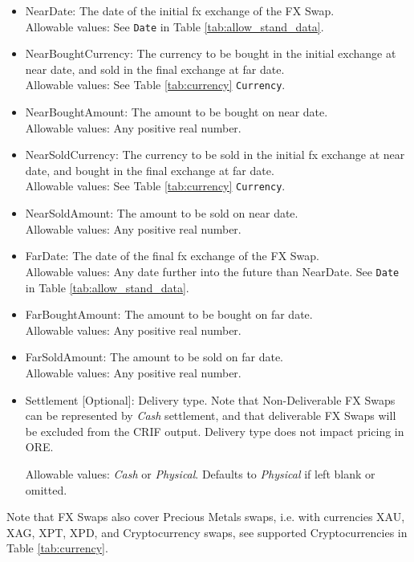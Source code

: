 \begin{itemize}
\item NearDate: The date of the initial fx exchange of the FX Swap. \\ Allowable values:  See \lstinline!Date! in Table \ref{tab:allow_stand_data}.
\item NearBoughtCurrency: The currency to be bought in the initial exchange at near date, and sold in the final exchange at far date.  \\ Allowable values:  See Table \ref{tab:currency} \lstinline!Currency!.
\item NearBoughtAmount: The amount to be bought on near date.  \\ Allowable values:  Any positive real number.
\item NearSoldCurrency: The currency to be sold in the initial fx exchange at near date, and bought in the final exchange at far date.   \\ Allowable values:  See Table \ref{tab:currency} \lstinline!Currency!.
\item NearSoldAmount: The amount to be sold on near date.  \\ Allowable values:  Any positive real number.
\item FarDate: The date of the final fx exchange of the FX Swap. \\ Allowable values:  Any date further into the future than NearDate. See \lstinline!Date! in Table  \ref{tab:allow_stand_data}.
\item FarBoughtAmount: The amount to be bought on far date.  \\ Allowable values:  Any positive real number.
\item FarSoldAmount: The amount to be sold on far date.  \\ Allowable values:  Any positive real number.
\item Settlement [Optional]: Delivery type.  Note that Non-Deliverable FX Swaps can be represented by \emph{Cash} settlement, and that deliverable FX Swaps will be excluded from the CRIF output. Delivery type does not impact pricing in ORE.  

Allowable values: \emph{Cash} or \emph{Physical}.  Defaults to \emph{Physical} if left blank or omitted.

\end{itemize}

Note that FX Swaps also cover Precious Metals swaps, i.e. with currencies XAU, XAG, XPT, XPD, and Cryptocurrency swaps,  see supported Cryptocurrencies in Table \ref{tab:currency}.
